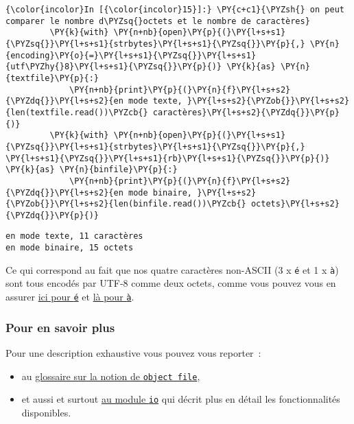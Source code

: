     \begin{Verbatim}[commandchars=\\\{\},frame=single,framerule=0.3mm,rulecolor=\color{cellframecolor}]
{\color{incolor}In [{\color{incolor}15}]:} \PY{c+c1}{\PYZsh{} on peut comparer le nombre d\PYZsq{}octets et le nombre de caractères}
         \PY{k}{with} \PY{n+nb}{open}\PY{p}{(}\PY{l+s+s1}{\PYZsq{}}\PY{l+s+s1}{strbytes}\PY{l+s+s1}{\PYZsq{}}\PY{p}{,} \PY{n}{encoding}\PY{o}{=}\PY{l+s+s1}{\PYZsq{}}\PY{l+s+s1}{utf\PYZhy{}8}\PY{l+s+s1}{\PYZsq{}}\PY{p}{)} \PY{k}{as} \PY{n}{textfile}\PY{p}{:}
             \PY{n+nb}{print}\PY{p}{(}\PY{n}{f}\PY{l+s+s2}{\PYZdq{}}\PY{l+s+s2}{en mode texte, }\PY{l+s+s2}{\PYZob{}}\PY{l+s+s2}{len(textfile.read())\PYZcb{} caractères}\PY{l+s+s2}{\PYZdq{}}\PY{p}{)}
         \PY{k}{with} \PY{n+nb}{open}\PY{p}{(}\PY{l+s+s1}{\PYZsq{}}\PY{l+s+s1}{strbytes}\PY{l+s+s1}{\PYZsq{}}\PY{p}{,} \PY{l+s+s1}{\PYZsq{}}\PY{l+s+s1}{rb}\PY{l+s+s1}{\PYZsq{}}\PY{p}{)} \PY{k}{as} \PY{n}{binfile}\PY{p}{:}
             \PY{n+nb}{print}\PY{p}{(}\PY{n}{f}\PY{l+s+s2}{\PYZdq{}}\PY{l+s+s2}{en mode binaire, }\PY{l+s+s2}{\PYZob{}}\PY{l+s+s2}{len(binfile.read())\PYZcb{} octets}\PY{l+s+s2}{\PYZdq{}}\PY{p}{)}
\end{Verbatim}


    \begin{Verbatim}[commandchars=\\\{\},frame=single,framerule=0.3mm,rulecolor=\color{cellframecolor}]
en mode texte, 11 caractères
en mode binaire, 15 octets
\end{Verbatim}

    Ce qui correspond au fait que nos quatre caractères non-ASCII (3 x
\texttt{é} et 1 x \texttt{à}) sont tous encodés par UTF-8 comme deux
octets, comme vous pouvez vous en assurer
\href{https://mothereff.in/utf-8\#\%C3\%A9}{ici pour \texttt{é}} et
\href{https://mothereff.in/utf-8\#\%C3\%A0}{là pour \texttt{à}}.

    \hypertarget{pour-en-savoir-plus}{%
\subsubsection{Pour en savoir plus}\label{pour-en-savoir-plus}}

    Pour une description exhaustive vous pouvez vous reporter~:

\begin{itemize}
\tightlist
\item
  au
  \href{https://docs.python.org/3/glossary.html\#term-file-object}{glossaire
  sur la notion de \texttt{object\ file}},
\item
  et aussi et surtout
  \href{https://docs.python.org/3/library/io.html\#module-io}{au module
  \texttt{io}} qui décrit plus en détail les fonctionnalités
  disponibles.
\end{itemize}


    
    
    
